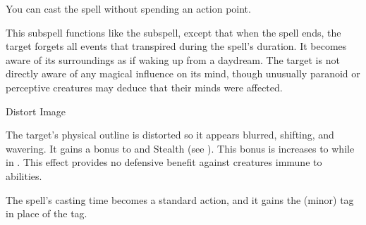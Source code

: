 You can cast the spell without spending an action point.






This subspell functions like the  subspell, except that when the spell ends, the target forgets all events that transpired during the spell's duration.
It becomes aware of its surroundings as if waking up from a daydream.
The target is not directly aware of any magical influence on its mind, though unusually paranoid or perceptive creatures may deduce that their minds were affected.





\newpage
\begin{spellsection}{Distort Image}

\begin{spellcontent}

\begin{spelltargetinginfo}



\end{spelltargetinginfo}


\begin{spelleffects}



\spelleffect
The target's physical outline is distorted so it appears blurred, shifting, and wavering.
It gains a  bonus to  and Stealth (see ).
This bonus is increases to  while in .
This effect provides no defensive benefit against creatures immune to  abilities.








\end{spelleffects}

\end{spellcontent}
\begin{spellfooter}


\end{spellfooter}
\begin{spellsubcontent}


\begin{spellcantrip}
The spell's casting time becomes a standard action, and it gains the  (minor) tag in place of the  tag.
\end{spellcantrip}


\end{spellsubcontent}
\end{spellsection}


